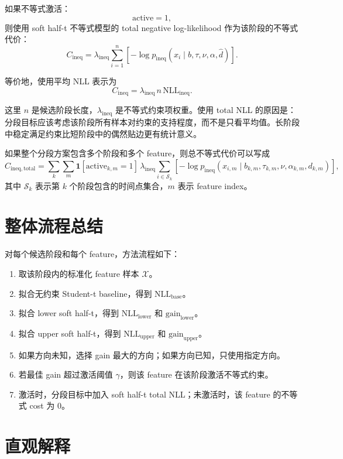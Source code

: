 \documentclass[11pt]{ctexart}
\begin{document}
如果不等式激活：
\[
 \mathrm{active}=1,
\]
则使用 soft half-t 不等式模型的 total negative log-likelihood 作为该阶段的不等式代价：
\[
 C_{\mathrm{ineq}}
 =
 \lambda_{\mathrm{ineq}}\sum_{i=1}^{n}
 \left[-\log p_{\mathrm{ineq}}(x_i\mid b,\tau,\nu,\alpha,\hat d)\right].
\]

等价地，使用平均 NLL 表示为
\[
 C_{\mathrm{ineq}}
 =
 \lambda_{\mathrm{ineq}}\,n\,\mathrm{NLL}_{\mathrm{ineq}}.
\]

这里 $n$ 是候选阶段长度，$\lambda_{\mathrm{ineq}}$ 是不等式约束项权重。使用 total NLL 的原因是：分段目标应该考虑该阶段所有样本对约束的支持程度，而不是只看平均值。长阶段中稳定满足约束比短阶段中的偶然贴边更有统计意义。

如果整个分段方案包含多个阶段和多个 feature，则总不等式代价可以写成
\[
 C_{\mathrm{ineq,total}}
 =
 \sum_{k}\sum_{m}
 \mathbf{1}[\mathrm{active}_{k,m}=1]\,
 \lambda_{\mathrm{ineq}}
 \sum_{i\in \mathcal{S}_k}
 \left[-\log p_{\mathrm{ineq}}(x_{i,m}\mid b_{k,m},\tau_{k,m},\nu,\alpha_{k,m},d_{k,m})\right],
\]
其中 $\mathcal{S}_k$ 表示第 $k$ 个阶段包含的时间点集合，$m$ 表示 feature index。

\section{整体流程总结}

对每个候选阶段和每个 feature，方法流程如下：
\begin{enumerate}[leftmargin=2em]
  \item 取该阶段内的标准化 feature 样本 $\mathcal{X}$。
  \item 拟合无约束 Student-t baseline，得到 $\mathrm{NLL}_{\mathrm{base}}$。
  \item 拟合 lower soft half-t，得到 $\mathrm{NLL}_{\mathrm{lower}}$ 和 $\mathrm{gain}_{\mathrm{lower}}$。
  \item 拟合 upper soft half-t，得到 $\mathrm{NLL}_{\mathrm{upper}}$ 和 $\mathrm{gain}_{\mathrm{upper}}$。
  \item 如果方向未知，选择 gain 最大的方向；如果方向已知，只使用指定方向。
  \item 若最佳 gain 超过激活阈值 $\gamma$，则该 feature 在该阶段激活不等式约束。
  \item 激活时，分段目标中加入 soft half-t total NLL；未激活时，该 feature 的不等式 cost 为 0。
\end{enumerate}

\section{直观解释}
\end{document}
